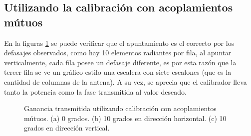 \subsection{Utilizando la calibración con acoplamientos mútuos}

En la figuras \ref{fig:nonErrMutual} se puede verificar que el apuntamiento es el correcto por los defasajes observados, como 
hay 10 elementos radiantes por fila, al apuntar verticalmente, cada fila posee un defasaje diferente, es por esta razón que la
tercer fila se ve un gráfico estilo una escalera con siete escalones (que es la cantidad de columnas de la antena). A su vez, 
se aprecia que el calibrador lleva tanto la potencia como la fase transmitida al valor deseado.
\begin{figure}[H]
	\centering
 	
		\caption{Ganancia transmitida utilizando calibración con acoplamientos mútuos. (a) 0 grados. (b) 10 grados en 
		dirección horizontal. (c) 10 grados en dirección vertical.}
	\label{fig:nonErrMutual}
\end{figure}

